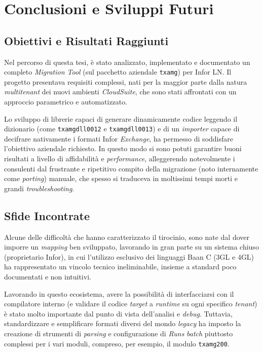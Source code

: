 \chapter{Conclusioni e Sviluppi Futuri}\label{ch:conclusioni-e-sviluppi-futuri}


\section{Obiettivi e Risultati Raggiunti}\label{sec:obiettivi-e-risultati-raggiunti}
Nel percorso di questa tesi, è stato analizzato, implementato e documentato un completo \textit{Migration Tool}
(sul pacchetto aziendale \texttt{txamg}) per Infor LN. Il progetto presentava requisiti complessi, nati per la
maggior parte dalla natura \textit{multitenant} dei nuovi ambienti \textit{CloudSuite}, che sono stati affrontati con un approccio parametrico
e automatizzato.

Lo sviluppo di librerie capaci di generare dinamicamente codice leggendo il dizionario (come \texttt{txamgdll0012} e \texttt{txamgdll0013}) e di un \textit{importer} capace di decifrare nativamente i formati Infor \textit{Exchange},
ha permesso di soddisfare l'obiettivo aziendale richiesto.
In questo modo si sono potuti garantire buoni risultati a livello di affidabilità e \textit{performance}, alleggerendo notevolmente i consulenti dal frustrante e ripetitivo compito della migrazione (noto internamente come \textit{porting}) manuale, che spesso si traduceva in moltissimi tempi morti e grandi \textit{troubleshooting}.

\section{Sfide Incontrate}\label{sec:sfide-incontrate}
Alcune delle difficoltà che hanno caratterizzato il tirocinio, sono nate dal dover imporre un \textit{mapping} ben sviluppato, lavorando in gran parte su un sistema chiuso (proprietario Infor),
in cui l'utilizzo esclusivo dei linguaggi Baan C (3GL e 4GL) ha rappresentato un vincolo tecnico ineliminabile, insieme a standard poco documentati e non intuitivi.

Lavorando in questo ecosistema, avere la possibilità di interfacciarsi con il compilatore interno (e validare il codice \textit{target} a \textit{runtime} su ogni specifico \textit{tenant}) è
stato molto importante dal punto di vista dell'analisi e \textit{debug}.
Tuttavia, standardizzare e semplificare formati diversi del mondo \textit{legacy} ha imposto la creazione di strumenti di \textit{parsing} e configurazione di \textit{Runs} \textit{batch} piuttosto complessi per i vari moduli, 
compreso, per esempio, il modulo \texttt{txamg200}.

